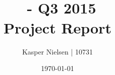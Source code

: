 \documentclass[11pt]{article}
\title{
	{\Huge \projectTitle \\}
	\bigskip
	\courseCode\ - Q3 2015 \\
	\medskip
	Project Report
	}
\author{Kasper Nielsen | 10731}
\date{\today} %
\begin{document}
\maketitle	%

\listoffixmes %

\newpage			%
\tableofcontents	%

\newpage


\newpage
	

\newpage
	

\newpage


\newpage
 

\newpage
% 



\newpage
\appendix


% 
\end{document}
